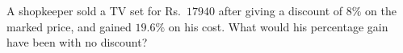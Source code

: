 A shopkeeper sold a TV set for Rs.~$17940$ after giving a discount of $8\%$ on the marked price, and gained $19.6\%$ on his cost. What would his percentage gain have been with no discount?
